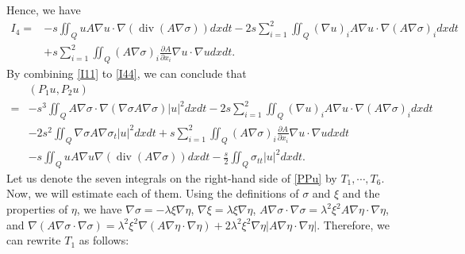 \documentclass[9pt,reqno]{amsart}
\theoremstyle{plain}
\numberwithin{equation}{section}
\numberwithin{theorem}{section}
\DeclareMathOperator*{\Div}{\mathrm{div}}
\begin{document}
	
	Hence, we have
	\begin{equation}\label{I44}
		\begin{split}
			I_4 = & -s \iint_Q u A \nabla u\cdot \nabla (\Div(A \nabla \sigma))dx  dt
			-2s  \sum_{i=1}^{2}\iint_{Q} (\nabla u)_i A \nabla u \cdot \nabla (A \nabla \sigma)_i dx dt  \\
			&
			+ s  \sum_{i=1}^{2}\iint_{Q} (A\nabla \sigma)_i \frac{\partial A}{\partial x_i} \nabla u \cdot \nabla u dx dt.
		\end{split}
	\end{equation}
	By combining \eqref{I11} to \eqref{I44}, we can conclude that
	\begin{equation}\label{PPu}
		\begin{aligned}
			&\left(P_1 u, P_2 u\right)\\
			= & -s^3 \iint_Q A \nabla \sigma\cdot \nabla(\nabla \sigma A \nabla \sigma)|u|^2 dx  dt
			-2s  \sum_{i=1}^{2}\iint_{Q} (\nabla u)_i A \nabla u \cdot \nabla (A \nabla \sigma)_i dx dt \\
			& -2s^2 \iint_Q \nabla \sigma A \nabla \sigma_t|u|^2 dx  dt+ s \sum_{i=1}^{2} \iint_{Q} (A\nabla \sigma)_i \frac{\partial A}{\partial x_i} \nabla u \cdot \nabla u dx dt\\
			&
			-s \iint_Q u A \nabla u \nabla(\Div(A \nabla \sigma)) dx  dt-\frac{s}{2} \iint_Q \sigma_{t t}|u|^2 dx  dt.
		\end{aligned}
	\end{equation}
	Let us denote the seven integrals on the right-hand side of \eqref{PPu} by $T_1, \cdots, T_6$. Now, we will estimate each of them.
	Using the definitions of $\sigma$ and $\xi$ and the properties of $\eta$, we have $\nabla \sigma = - \lambda \xi \nabla \eta$, $\nabla \xi = \lambda \xi \nabla \eta$, $A \nabla \sigma \cdot \nabla \sigma = \lambda^2 \xi^2 A\nabla \eta \cdot \nabla \eta$, and $\nabla( A \nabla \sigma \cdot \nabla \sigma) = \lambda^2 \xi^2 \nabla (A\nabla \eta \cdot \nabla \eta) + 2\lambda^2 \xi^2 \nabla \eta \left| A \nabla \eta \cdot \nabla \eta \right|$. Therefore, we can rewrite $T_1$ as follows:
\end{document}
